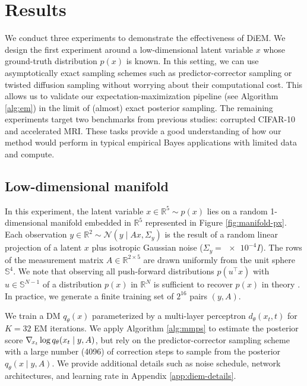 \section{Results} \label{sec:diem-results}

We conduct three experiments to demonstrate the effectiveness of DiEM. We design the first experiment around a low-dimensional latent variable $x$ whose ground-truth distribution $p(x)$ is known. In this setting, we can use asymptotically exact sampling schemes such as predictor-corrector sampling \cite{song2021scorebased, rozet2023scorebased} or twisted diffusion sampling \cite{wu2023practical} without worrying about their computational cost. This allows us to validate our expectation-maximization pipeline (see Algorithm \ref{alg:em}) in the limit of (almost) exact posterior sampling. The remaining experiments target two benchmarks from previous studies: corrupted CIFAR-10 and accelerated MRI. These tasks provide a good understanding of how our method would perform in typical empirical Bayes applications with limited data and compute.

\subsection{Low-dimensional manifold}

In this experiment, the latent variable $x \in \mathbb{R}^5 \sim p(x)$ lies on a random 1-dimensional manifold embedded in $\mathbb{R}^5$ represented in Figure \ref{fig:manifold-px}. Each observation $y \in \mathbb{R}^2 \sim \mathcal{N}(y \mid Ax, \Sigma_y)$ is the result of a random linear projection of a latent $x$ plus isotropic Gaussian noise ($\Sigma_y = \num{e-4} I$). The rows of the measurement matrix $A \in \mathbb{R}^{2 \times 5}$ are drawn uniformly from the unit sphere $\mathbb{S}^{4}$. We note that observing all push-forward distributions $p(u^\top \! x)$ with $u \in \mathbb{S}^{N - 1}$ of a distribution $p(x)$ in $\mathbb{R}^N$ is sufficient to recover $p(x)$ in theory \cite{bonneel2015sliced, nadjahi2020statistical}. In practice, we generate a finite training set of $2^{16}$ pairs $(y, A)$.

We train a DM $q_\theta(x)$ parameterized by a multi-layer perceptron $d_\theta(x_t, t)$ for $K = 32$ EM iterations. We apply Algorithm \ref{alg:mmps} to estimate the posterior score $\nabla_{\!{x_t}} \log q_{\theta}(x_t \mid y, A)$, but rely on the predictor-corrector \cite{song2021scorebased, rozet2023scorebased} sampling scheme with a large number (4096) of correction steps to sample from the posterior $q_\theta(x \mid y, A)$. We provide additional details such as noise schedule, network architectures, and learning rate in Appendix \ref{app:diem-details}.

